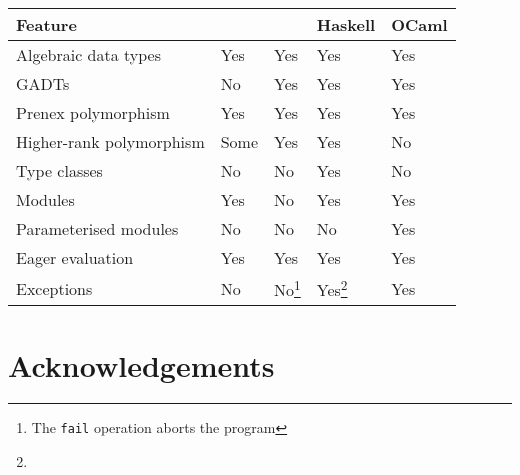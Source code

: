 \documentclass[
    9pt,            %
    techreport,        %
    affiltop,       %
]{art}
\begin{document}
\vspace*{2mm}
\begin{minipage}[b]{\hsize}\centering

\begin{tabular}{lllll}
\hline
\textbf{Feature} & \textbf{\Juvix{}} & \textbf{\JuvixCore{}} & \textbf{Haskell} & \textbf{OCaml} \\ \hline
Algebraic data types  &  Yes   &  Yes   &  Yes  & Yes \\
GADTs  &  No   &  Yes   &  Yes &  Yes  \\
Prenex polymorphism  &  Yes   &  Yes &  Yes  &  Yes \\
Higher-rank polymorphism  &  Some   &  Yes   &  Yes  &   No  \\
Type classes  &  No   &  No   &  Yes &   No \\
Modules  &  Yes   &  No   &  Yes &   Yes \\
Parameterised modules  &  No   &  No   &  No &   Yes \\
Eager evaluation  &  Yes   &  Yes   &  Yes &   Yes \\
Exceptions &  No   &  No\footnote{The \texttt{fail} \JuvixCore{} operation aborts the program }   &  Yes\footnote{}  &  Yes \\
\hline
\end{tabular}
\end{minipage}


\section*{Acknowledgements}


\nocite{*}

\end{document}
